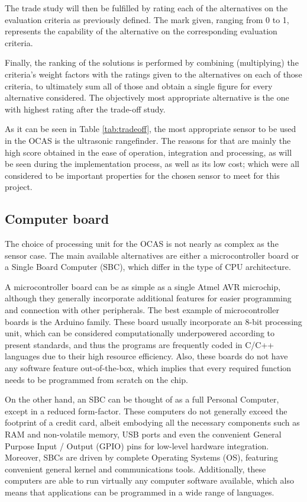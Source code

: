The trade study will then be fulfilled by rating each of the alternatives on the evaluation criteria as previously defined.
The mark given, ranging from 0 to 1, represents the capability of the alternative on the corresponding evaluation criteria.

Finally, the ranking of the solutions is performed by combining (multiplying) the criteria's weight factors with the ratings given to the alternatives on each of those criteria, to ultimately sum all of those and obtain a single figure for every alternative considered.
The objectively most appropriate alternative is the one with highest rating after the trade-off study.



As it can be seen in Table \ref{tab:tradeoff}, the most appropriate sensor to be used in the OCAS is the ultrasonic rangefinder.
The reasons for that are mainly the high score obtained in the ease of operation, integration and processing, as will be seen during the implementation process, as well as its low cost; which were all considered to be important properties for the chosen sensor to meet for this project.



\subsection{Computer board}

The choice of processing unit for the OCAS is not nearly as complex as the sensor case.
The main available alternatives are either a microcontroller board or a Single Board Computer (SBC), which differ in the type of CPU architecture.

A microcontroller board can be as simple as a single Atmel AVR microchip, although they generally incorporate additional features for easier programming and connection with other peripherals.
The best example of microcontroller boards is the Arduino family.
These board usually incorporate an 8-bit processing unit, which can be considered computationally underpowered according to present standards, and thus the programs are frequently coded in C/C++ languages due to their high resource efficiency.
Also, these boards do not have any software feature out-of-the-box, which implies that every required function needs to be programmed from scratch on the chip.

On the other hand, an SBC can be thought of as a full Personal Computer, except in a reduced form-factor.
These computers do not generally exceed the footprint of a credit card, albeit embodying all the necessary components such as RAM and non-volatile memory, USB ports and even the convenient General Purpose Input / Output (GPIO) pins for low-level hardware integration.
Moreover, SBCs are driven by complete Operating Systems (OS), featuring convenient general kernel and communications tools.
Additionally, these computers are able to run virtually any computer software available, which also means that applications can be programmed in a wide range of languages. 

